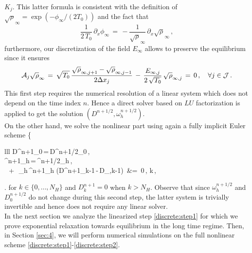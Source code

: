 \documentclass[11pt]{amsart}
\numberwithin{equation}{section}
\numberwithin{figure}{section}
\begin{document}
$K_j$. This latter formula is consistent with the definition of
$\sqrt\rho_{\infty}= \exp\left({-\phi_{\infty}/(2T_0)}\right)$ and the fact that
$$
\frac{1}{2\,T_0}\,\partial_x\phi_{\infty} \,=\, -\frac{1}{\sqrt\rho_{\infty}} \, \partial_x\sqrt\rho_{\infty}\,,
$$
furthermore, our discretization of the field $E_{\infty}$ allows to preserve the equilibrium since it ensures
\begin{equation}\label{preserves:equi:h}
{\mathcal A}_j \sqrt{\rho}_{\infty}\,=\,
\sqrt{T_0}\,\frac{\sqrt{\rho}_{\infty,j+1} - \sqrt{\rho}_{\infty,j-1}}{2\Delta
	x_j}  \,-\, \frac{E_{\infty,j}}{2\,\sqrt{T_0}}\, \sqrt{\rho}_{\infty,j}
	\,=\,
0\,,\quad\forall j\in{\mathcal J}\,.
\end{equation}
This first step requires the numerical resolution of a linear system
which does not depend on the time index $n$. Hence a direct solver based on
$LU$ factorization is applied to get the solution
$\left(D^{n+1/2},\omega_h^{n+1/2}\right)$.\\

On the other hand, we solve the nonlinear part using
again a fully implicit Euler scheme
\be
	\label{discrete:step2}
	\left\{
	\begin{array}{lll}
		\ds
		D^{n+1}_{0}\,=\,D^{n+1/2}_{0}\,,
		\\[1.em]
		\ds
		\omega^{n+1}_{h}\,=\,\omega^{n+1/2}_{h}\,,
		\\[1.em]
		\ds
		\eps\,  \,+\,
		\,_{h}\,\omega^{n+1}_h
		\left(D^{n+1}_{k-1}\,-\,D_{\infty,k-1}\right)  \,&\ds=\,
	0\,,\,\,k\,,
	\end{array}\right.
	\ee
for $k\in\{0,\ldots,N_H\}$ and $D_k^{n+1}=0$ when $k>N_H$.
Observe that since $\omega_h^{n+1/2}$ and $D_0^{n+1/2}$ do not change
during this second step, the latter system is trivially invertible and hence does not require
any linear solver. \\
In the next section we analyze the linearized step \eqref{discrete:step1} for which we prove exponential relaxation towards equilibrium in the long time regime. Then, in Section \ref{sec:4}, we will perform numerical simulations on the full nonlinear scheme \eqref{discrete:step1}-\eqref{discrete:step2}.
\end{document}
